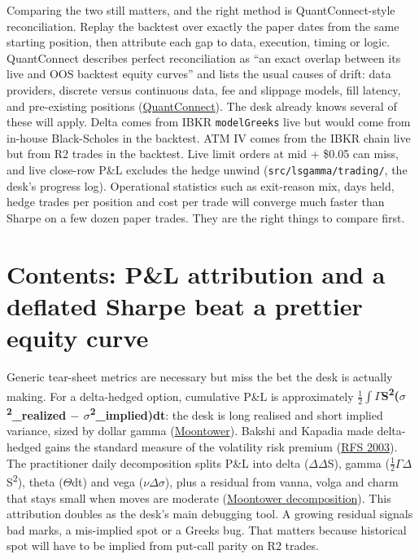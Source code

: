 \documentclass{article}
\begin{document}
Comparing the two still matters, and the right method is QuantConnect-style reconciliation. Replay the backtest over exactly the paper dates from the same starting position, then attribute each gap to data, execution, timing or logic. QuantConnect describes perfect reconciliation as ``an exact overlap between its live and OOS backtest equity curves'' and lists the usual causes of drift: data providers, discrete versus continuous data, fee and slippage models, fill latency, and pre-existing positions (\href{https://www.quantconnect.com/docs/v2/cloud-platform/live-trading/reconciliation}{QuantConnect}). The desk already knows several of these will apply. Delta comes from IBKR \texttt{modelGreeks} live but would come from in-house Black-Scholes in the backtest. ATM IV comes from the IBKR chain live but from R2 trades in the backtest. Live limit orders at mid + \$0.05 can miss, and live close-row P\&L excludes the hedge unwind (\texttt{src/\allowbreak{}lsgamma/\allowbreak{}trading/\allowbreak{}}, the desk's progress log). Operational statistics such as exit-reason mix, days held, hedge trades per position and cost per trade will converge much faster than Sharpe on a few dozen paper trades. They are the right things to compare first.

\section{Contents: P\&L attribution and a deflated Sharpe beat a prettier equity curve}

Generic tear-sheet metrics are necessary but miss the bet the desk is actually making. For a delta-hedged option, cumulative P\&L is approximately \textbf{\ensuremath{\frac12}\ensuremath{\int}\ensuremath{\Gamma}S\textsuperscript{2}(\ensuremath{\sigma}\textsuperscript{2}\_realized \ensuremath{-} \ensuremath{\sigma}\textsuperscript{2}\_implied)dt}: the desk is long realised and short implied variance, sized by dollar gamma (\href{https://moontowermeta.com/sparring-with-ai-theoretical-options-p-l-vs-discrete-hedging/}{Moontower}). Bakshi and Kapadia made delta-hedged gains the standard measure of the volatility risk premium (\href{https://www.jstor.org/stable/1262684}{RFS 2003}). The practitioner daily decomposition splits P\&L into delta (\ensuremath{\Delta}\textperiodcentered{}\ensuremath{\Delta}S), gamma (\ensuremath{\frac12}\ensuremath{\Gamma}\textperiodcentered{}\ensuremath{\Delta}S\textsuperscript{2}), theta (\ensuremath{\Theta}\textperiodcentered{}dt) and vega (\ensuremath{\nu}\textperiodcentered{}\ensuremath{\Delta}\ensuremath{\sigma}), plus a residual from vanna, volga and charm that stays small when moves are moderate (\href{https://moontower.ai/blog/dynamic-hedging-option-p-l-decomposition}{Moontower decomposition}). This attribution doubles as the desk's main debugging tool. A growing residual signals bad marks, a mis-implied spot or a Greeks bug. That matters because historical spot will have to be implied from put-call parity on R2 trades.
\end{document}
